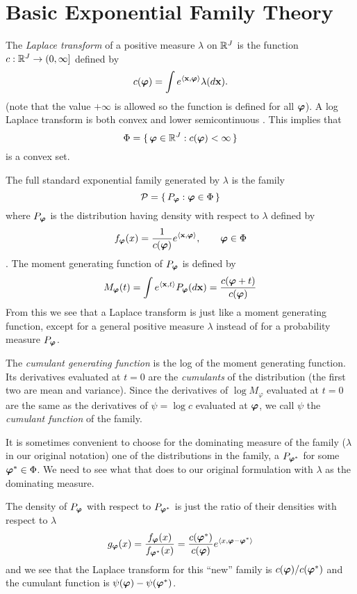 
\section{Basic Exponential Family Theory}

The \emph{Laplace transform} of a positive measure $\lambda$ on $\mathbb{R}^J$
is \citep[Chapter~7]{barndorff} the function $c : \mathbb{R}^J \to (0, \infty]$
defined by
$$
   c({\boldsymbol{\varphi}}) = \int e^{\langle \mathbf{x}, {\boldsymbol{\varphi}} \rangle} \lambda(d \mathbf{x}).
$$
(note that the value $+ \infty$ is allowed so the function is defined for
all ${\boldsymbol{\varphi}}$).  A log Laplace transform is both convex and lower
semicontinuous \citep[Theorem~7.1]{barndorff}.  This implies that
$$
   \Phi = \{\,  {\boldsymbol{\varphi}} \in \mathbb{R}^J : c({\boldsymbol{\varphi}}) < \infty  \,\}
$$
is a convex set.

The full standard exponential family generated by $\lambda$ is the family
$$
   \mathcal{P} = \{\,  P_{\boldsymbol{\varphi}} :  {\boldsymbol{\varphi}} \in \Phi  \,\}
$$
where $P_{\boldsymbol{\varphi}}$ is the distribution having density with respect to
$\lambda$ defined by
$$
   f_{\boldsymbol{\varphi}}(x) = \frac{1}{c({\boldsymbol{\varphi}})} e^{\langle \mathbf{x}, {\boldsymbol{\varphi}} \rangle},
   \qquad {\boldsymbol{\varphi}} \in \Phi
$$
\citep[Chapter~8]{barndorff}.  The moment generating function
of $P_{\boldsymbol{\varphi}}$ is defined by
$$
   M_{\boldsymbol{\varphi}}(t)
   =
   \int e^{\langle \mathbf{x}, t \rangle} P_{\boldsymbol{\varphi}}(d \mathbf{x})
   =
   \frac{c({\boldsymbol{\varphi}} + t)}{c({\boldsymbol{\varphi}})}
$$
From this we see that a Laplace transform is just like a moment generating
function, except for a general positive measure $\lambda$ instead of for a
probability measure $P_{\boldsymbol{\varphi}}$.

The \emph{cumulant generating function} is the log of the moment generating
function.  Its derivatives evaluated at $t = 0$ are the \emph{cumulants}
of the distribution (the first two are mean and variance).  Since the
derivatives of $\log M_\varphi$ evaluated at $t = 0$ are the same as the
derivatives of $\psi = \log c$ evaluated at ${\boldsymbol{\varphi}}$, we call $\psi$
the \emph{cumulant function} of the family.

It is sometimes convenient to choose for the dominating measure of the family
($\lambda$ in our original notation) one of the distributions in the family,
a $P_{{\boldsymbol{\varphi}}^*}$ for some ${\boldsymbol{\varphi}}^* \in \Phi$.
We need to see what that does to our
original formulation with $\lambda$ as the dominating measure.

The density of $P_{\boldsymbol{\varphi}}$ with respect to $P_{{\boldsymbol{\varphi}}^*}$ is
just the ratio of their densities with respect to $\lambda$
\begin{equation} \label{eq:move}
   g_{\boldsymbol{\varphi}}(x)
   =
   \frac{f_{\boldsymbol{\varphi}}(x)}{f_{{\boldsymbol{\varphi}}^*}(x)}
   =
   \frac{c({\boldsymbol{\varphi}}^*)}{c({\boldsymbol{\varphi}})}
   e^{\langle x, {\boldsymbol{\varphi}} - {\boldsymbol{\varphi}}^* \rangle}
\end{equation}
and we see that the Laplace transform for this ``new'' family is
$c({\boldsymbol{\varphi}}) / c({\boldsymbol{\varphi}}^*)$ and the cumulant function is
$\psi({\boldsymbol{\varphi}}) - \psi({\boldsymbol{\varphi}}^*)$.

